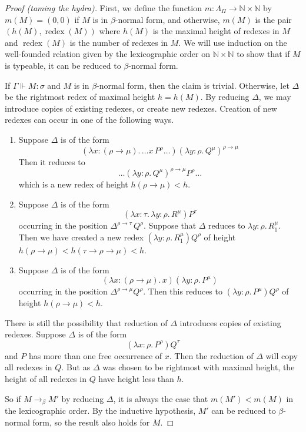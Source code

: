 \begin{proof}[Proof (taming the hydra)]
    First, we define the function \( m : \Lambda_\Pi \to \mathbb N \times \mathbb N \) by \( m(M) = (0, 0) \) if \( M \) is in \( \beta \)-normal form, and otherwise, \( m(M) \) is the pair \( (h(M), \operatorname{redex}(M)) \) where \( h(M) \) is the maximal height of redexes in \( M \) and \( \operatorname{redex}(M) \) is the number of redexes in \( M \).
    We will use induction on the well-founded relation given by the lexicographic order on \( \mathbb N \times \mathbb N \) to show that if \( M \) is typeable, it can be reduced to \( \beta \)-normal form.

    If \( \Gamma \Vdash M : \sigma \) and \( M \) is in \( \beta \)-normal form, then the claim is trivial.
    Otherwise, let \( \Delta \) be the rightmost redex of maximal height \( h = h(M) \).
    By reducing \( \Delta \), we may introduce copies of existing redexes, or create new redexes.
    Creation of new redexes can occur in one of the following ways.
    \begin{enumerate}
        \item Suppose \( \Delta \) is of the form
        \[ (\lambda x:(\rho \to \mu).\, \dots x\, P^\rho \dots)(\lambda y:\rho.\, Q^\mu)^{\rho \to \mu} \]
        Then it reduces to
        \[ \dots (\lambda y:\rho.\, Q^\mu)^{\rho \to \mu} P^\rho \dots \]
        which is a new redex of height \( h(\rho \to \mu) < h \).
        \item Suppose \( \Delta \) is of the form
        \[ (\lambda x:\tau.\, \lambda y:\rho.\, R^\mu)P^\tau \]
        occurring in the position \( \Delta^{\rho \to \tau}\, Q^\rho \).
        Suppose that \( \Delta \) reduces to \( \lambda y:\rho.\, R^\mu_1 \).
        Then we have created a new redex \( (\lambda y:\rho.\, R^\mu_1) Q^\rho \) of height \( h(\rho \to \mu) < h(\tau \to \rho \to \mu) < h \).
        \item Suppose \( \Delta \) is of the form
        \[ (\lambda x:(\rho \to \mu).\, x)(\lambda y:\rho.\, P^\mu) \]
        occurring in the position \( \Delta^{\rho \to \mu} Q^\rho \).
        Then this reduces to \( (\lambda y:\rho.\, P^\mu) Q^\rho \) of height \( h(\rho \to \mu) < h \).
    \end{enumerate}
    There is still the possibility that reduction of \( \Delta \) introduces copies of existing redexes.
    Suppose \( \Delta \) is of the form
    \[ (\lambda x: \rho.\, P^\rho) Q^\tau \]
    and \( P \) has more than one free occurrence of \( x \).
    Then the reduction of \( \Delta \) will copy all redexes in \( Q \).
    But as \( \Delta \) was chosen to be rightmost with maximal height, the height of all redexes in \( Q \) have height less than \( h \).

    So if \( M \to_\beta M' \) by reducing \( \Delta \), it is always the case that \( m(M') < m(M) \) in the lexicographic order.
    By the inductive hypothesis, \( M' \) can be reduced to \( \beta \)-normal form, so the result also holds for \( M \).
\end{proof}
